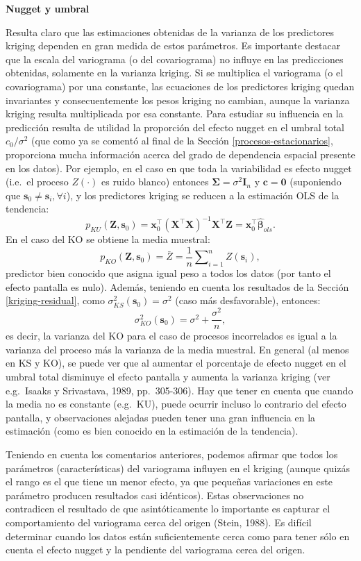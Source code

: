 \documentclass[
  spanish,
]{book}
\theoremstyle{break}
\theoremstyle{definition}
\theoremstyle{definition}
\theoremstyle{definition}
\theoremstyle{definition}
\theoremstyle{remark}
\begin{document}
\textbf{Nugget y umbral}

Resulta claro que las estimaciones obtenidas de la varianza de los predictores kriging dependen en gran medida de estos parámetros.
Es importante destacar que la escala del variograma (o del covariograma) no influye en las predicciones obtenidas, solamente en la varianza kriging.
Si se multiplica el variograma (o el covariograma) por una constante, las ecuaciones de los predictores kriging quedan invariantes y consecuentemente los pesos kriging no cambian, aunque la varianza kriging resulta multiplicada por esa constante.
Para estudiar su influencia en la predicción resulta de utilidad la proporción del efecto nugget en el umbral total \(c_{0} /\sigma^{2}\) (que como ya se comentó al final de la Sección \ref{procesos-estacionarios}, proporciona mucha información acerca del grado de dependencia espacial presente en los datos).
Por ejemplo, en el caso en que toda la variabilidad es efecto nugget (i.e.~el proceso \(Z(\cdot)\) es ruido blanco) entonces \(\boldsymbol{\Sigma}=\sigma^{2} \mathbf{I}_{n}\) y \(\mathbf{c}=\mathbf{0}\) (suponiendo que \(\mathbf{s}_{0}\neq \mathbf{s}_{i}, \forall i\)), y los predictores kriging se reducen a la estimación OLS de la tendencia:
\[p_{KU} (\mathbf{Z},\mathbf{s}_{0}) = \mathbf{x}_0^\top(\mathbf{X }^\top\mathbf{X})^{-1} \mathbf{X}^\top\mathbf{Z} = \mathbf{x }_0^\top\hat{\boldsymbol{\beta}}_{ols}.\]
En el caso del KO se obtiene la media muestral:
\[p_{KO} (\mathbf{Z},\mathbf{s}_{0})=\bar{Z} =\dfrac{1}{n}
\sum\nolimits_{i=1}^{n}Z(\mathbf{s}_{i}),\]
predictor bien conocido que asigna igual peso a todos los datos (por tanto el efecto pantalla es nulo).
Además, teniendo en cuenta los resultados de la Sección \ref{kriging-residual}, como \(\sigma_{KS}^{2} (\mathbf{s}_{0})=\sigma^{2}\) (caso más desfavorable), entonces:
\[\sigma_{KO}^{2} (\mathbf{s}_{0})=\sigma_{}^{2} +\dfrac{\sigma_{}^{2}
}{n},\]
es decir, la varianza del KO para el caso de procesos incorrelados es igual a la varianza del proceso más la varianza de la media muestral.
En general (al menos en KS y KO), se puede ver que al aumentar el porcentaje de efecto nugget en el umbral total disminuye el efecto pantalla y aumenta la varianza kriging (ver e.g.~Isaaks y Srivastava, 1989, pp.~305-306).
Hay que tener en cuenta que cuando la media no es constante (e.g.~KU), puede ocurrir incluso lo contrario del efecto pantalla, y observaciones alejadas pueden tener una gran influencia en la estimación (como es bien conocido en la estimación de la tendencia).

Teniendo en cuenta los comentarios anteriores, podemos afirmar que todos los parámetros (características) del variograma influyen en el kriging (aunque quizás el rango es el que tiene un menor efecto, ya que pequeñas variaciones en este parámetro producen resultados casi idénticos).
Estas observaciones no contradicen el resultado de que asintóticamente lo importante es capturar el comportamiento del variograma cerca del origen (Stein, 1988).
Es difícil determinar cuando los datos están suficientemente cerca como para tener sólo en cuenta el efecto nugget y la pendiente del variograma cerca del origen.
\end{document}
